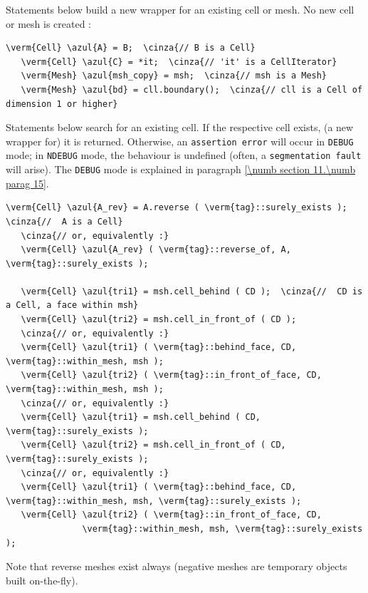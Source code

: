 Statements below build a new wrapper for an existing cell or mesh.
No new cell or mesh is created :

\begin{Verbatim}[commandchars=\\\{\},formatcom=\small\tt,
   baselinestretch=0.94,framesep=2mm                      ]
   \verm{Cell} \azul{A} = B;  \cinza{// B is a Cell}
   \verm{Cell} \azul{C} = *it;  \cinza{// 'it' is a CellIterator}
   \verm{Mesh} \azul{msh_copy} = msh;  \cinza{// msh is a Mesh}
   \verm{Mesh} \azul{bd} = cll.boundary();  \cinza{// cll is a Cell of dimension 1 or higher}
\end{Verbatim}

Statements below search for an existing cell.
If the respective cell exists, (a new wrapper for) it is returned.
Otherwise, an {\small\tt assertion error} will occur in {\small\tt DEBUG} mode;
in {\small\tt NDEBUG} mode, the behaviour is undefined (often, a {\small\tt segmentation fault}
will arise).
The {\small\tt DEBUG} mode is explained in paragraph \ref{\numb section 11.\numb parag 15}.

\begin{Verbatim}[commandchars=\\\{\},formatcom=\small\tt,
   baselinestretch=0.94,framesep=2mm                      ]
   \verm{Cell} \azul{A_rev} = A.reverse ( \verm{tag}::surely_exists );  \cinza{//  A is a Cell}
   \cinza{// or, equivalently :}
   \verm{Cell} \azul{A_rev} ( \verm{tag}::reverse_of, A, \verm{tag}::surely_exists );

   \verm{Cell} \azul{tri1} = msh.cell_behind ( CD );  \cinza{//  CD is a Cell, a face within msh}
   \verm{Cell} \azul{tri2} = msh.cell_in_front_of ( CD );
   \cinza{// or, equivalently :}
   \verm{Cell} \azul{tri1} ( \verm{tag}::behind_face, CD, \verm{tag}::within_mesh, msh );
   \verm{Cell} \azul{tri2} ( \verm{tag}::in_front_of_face, CD, \verm{tag}::within_mesh, msh );
   \cinza{// or, equivalently :}
   \verm{Cell} \azul{tri1} = msh.cell_behind ( CD, \verm{tag}::surely_exists );
   \verm{Cell} \azul{tri2} = msh.cell_in_front_of ( CD, \verm{tag}::surely_exists );
   \cinza{// or, equivalently :}
   \verm{Cell} \azul{tri1} ( \verm{tag}::behind_face, CD, \verm{tag}::within_mesh, msh, \verm{tag}::surely_exists );
   \verm{Cell} \azul{tri2} ( \verm{tag}::in_front_of_face, CD,
               \verm{tag}::within_mesh, msh, \verm{tag}::surely_exists );
\end{Verbatim}

Note that reverse meshes exist always (negative meshes are temporary objects built
on-the-fly).

